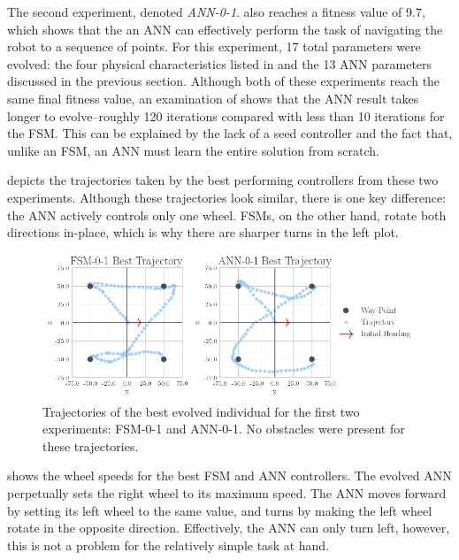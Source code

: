 The second experiment, denoted \emph{ANN-0-1}. also reaches a fitness value of 9.7, which shows that the an ANN can effectively perform the task of navigating the robot to a sequence of points.
%
For this experiment, 17 total parameters were evolved: the four physical characteristics listed in  and the 13 ANN parameters discussed in the previous section.
%
Although both of these experiments reach the same final fitness value, an examination of  shows that the ANN result takes longer to evolve--roughly 120 iterations compared with less than 10 iterations for the FSM.
%
This can be explained by the lack of a seed controller and the fact that, unlike an FSM, an ANN must learn the entire solution from scratch.


 depicts the trajectories taken by the best performing controllers from these two experiments.
%
Although these trajectories look similar, there is one key difference: the ANN actively controls only one wheel. FSMs, on the other hand, rotate both directions in-place, which is why there are sharper turns in the left plot.


\begin{figure}[!ht]
    \centering

    \includegraphics[width=\columnwidth]{figures/4-results/0-1-best_trajectories.png}


    \caption{Trajectories of the best evolved individual for the first two experiments: FSM-0-1 and ANN-0-1. No obstacles were present for these trajectories.}
    \label{fig:0-1-best-trajectories}

\end{figure}


 shows the wheel speeds for the best FSM and ANN controllers.
%
The evolved ANN perpetually sets the right wheel to its maximum speed.
%
The ANN moves forward by setting its left wheel to the same value, and turns by making the left wheel rotate in the opposite direction.
%
Effectively, the ANN can only turn left, however, this is not a problem for the relatively simple task at hand.



